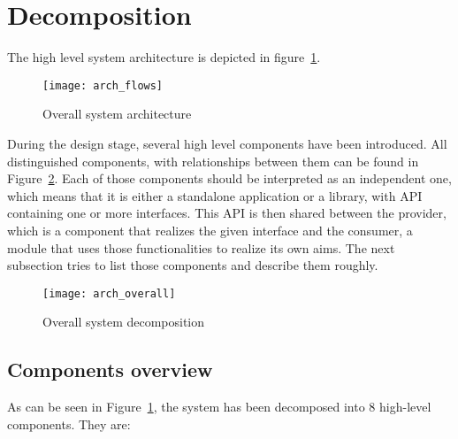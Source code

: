 %
\section{Decomposition}
\label{sec:arch_decomposition}

The high level system architecture is depicted in figure~\ref{fig:arch_overall}. 

\begin{figure}[ht]
\centering
\texttt{[image: arch\_flows]}
\caption{Overall system architecture}
\label{fig:arch_overall}
\end{figure}

During the design stage, several high level components have been introduced. All distinguished components, with relationships between them can be found in Figure~\ref{fig:decomposition_overall}. Each of those components should be interpreted as an independent one, which means that it is either a standalone application or a library, with API containing one or more interfaces. This API is then shared between the provider, which is a component that realizes the given interface and the consumer, a module that uses those functionalities to realize its own aims. The next subsection tries to list those components and describe them roughly.

\begin{figure}[ht]
\centering
\texttt{[image: arch\_overall]}
\caption{Overall system decomposition}
\label{fig:decomposition_overall}
\end{figure}

\subsection{Components overview}

As can be seen in Figure~\ref{fig:arch_overall}, the system has been decomposed into 8 high-level components. They are:


